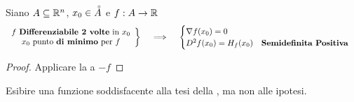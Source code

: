 \begin{proposition}
	Siano $A \subseteq \mathbb{R}^n$, $x_0 \in \accentset{\circ}{A}$ e $f: A \to \mathbb{R}$
	\[
		\left.
			\begin{array}{c}
				f \text{ \textbf{Differenziabile 2 volte} in } x_0\\
				x_0 \text{ punto \textbf{di minimo} per } f
			\end{array}
		\right\}
		\quad \implies \quad
		\begin{cases}
			\nabla f(x_0) = 0\\
			D^2f(x_0) = H_f(x_0) \quad \text{\textbf{Semidefinita Positiva}}
		\end{cases}
	\]
	\begin{proof}
		Applicare la  a $-f$
	\end{proof}
\end{proposition}
\begin{exercise}
	Esibire una funzione soddisfacente alla tesi della , ma non alle ipotesi.
\end{exercise}

